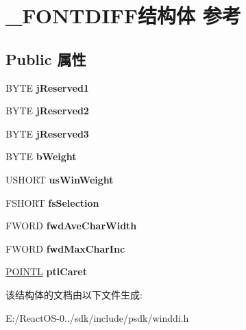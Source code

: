 \hypertarget{struct___f_o_n_t_d_i_f_f}{}\section{\+\_\+\+F\+O\+N\+T\+D\+I\+F\+F结构体 参考}
\label{struct___f_o_n_t_d_i_f_f}
\subsection*{Public 属性}
\begin{DoxyCompactItemize}
\item 
\mbox{\label{struct___f_o_n_t_d_i_f_f_a007a5084ebc1af9b23aa2424157b8573}} 
B\+Y\+TE {\bfseries j\+Reserved1}
\item 
\mbox{\label{struct___f_o_n_t_d_i_f_f_a1a629f4822007b083a03807446196676}} 
B\+Y\+TE {\bfseries j\+Reserved2}
\item 
\mbox{\label{struct___f_o_n_t_d_i_f_f_a52b95323d7e497907d3b2483ee19698e}} 
B\+Y\+TE {\bfseries j\+Reserved3}
\item 
\mbox{\label{struct___f_o_n_t_d_i_f_f_a948d653c0e3fbf5517571c1e01635396}} 
B\+Y\+TE {\bfseries b\+Weight}
\item 
\mbox{\label{struct___f_o_n_t_d_i_f_f_ad49d9a7d3753ee358b5b812d74e5ead9}} 
U\+S\+H\+O\+RT {\bfseries us\+Win\+Weight}
\item 
\mbox{\label{struct___f_o_n_t_d_i_f_f_a0d278d64fb45c5ea88792b40cdc9bde3}} 
F\+S\+H\+O\+RT {\bfseries fs\+Selection}
\item 
\mbox{\label{struct___f_o_n_t_d_i_f_f_ae22a0c1e522c51965b88765680c34a32}} 
F\+W\+O\+RD {\bfseries fwd\+Ave\+Char\+Width}
\item 
\mbox{\label{struct___f_o_n_t_d_i_f_f_ae57c16e43484b0db7b1dfab921cb5207}} 
F\+W\+O\+RD {\bfseries fwd\+Max\+Char\+Inc}
\item 
\mbox{\label{struct___f_o_n_t_d_i_f_f_a3b742a7911e0a6c5378a726cd6c882ea}} 
\hyperlink{struct___p_o_i_n_t_l}{P\+O\+I\+N\+TL} {\bfseries ptl\+Caret}
\end{DoxyCompactItemize}


该结构体的文档由以下文件生成\+:\begin{DoxyCompactItemize}
\item 
E\+:/\+React\+O\+S-\/0../sdk/include/psdk/winddi.\+h\end{DoxyCompactItemize}
